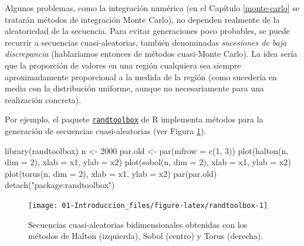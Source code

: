 \documentclass[
  10pt,
]{book}
\newenvironment{Shaded}{\begin{snugshade}}{\end{snugshade}}
\newcommand{\AttributeTok}[1]{\textcolor[rgb]{0.77,0.63,0.00}{#1}}
\newcommand{\DecValTok}[1]{\textcolor[rgb]{0.00,0.00,0.81}{#1}}
\newcommand{\FunctionTok}[1]{\textcolor[rgb]{0.00,0.00,0.00}{#1}}
\newcommand{\NormalTok}[1]{#1}
\newcommand{\OtherTok}[1]{\textcolor[rgb]{0.56,0.35,0.01}{#1}}
\newcommand{\StringTok}[1]{\textcolor[rgb]{0.31,0.60,0.02}{#1}}
\theoremstyle{break}
\theoremstyle{nonumberplain}
\begin{document}
Algunos problemas, como la integración numérica (en el Capítulo \ref{monte-carlo} se tratarán métodos de integración Monte Carlo), no dependen realmente de la aleatoriedad de la secuencia. Para evitar generaciones poco probables, se puede recurrir a secuencias cuasi-aleatorias, también denominadas \emph{sucesiones de baja discrepancia} (hablaríamos entonces de métodos cuasi-Monte Carlo). La idea sería que la proporción de valores en una región cualquiera sea siempre aproximadamente proporcional a la medida de la región (como sucedería en media con la distribución uniforme, aunque no necesariamente para una realización concreta).

Por ejemplo, el paquete \href{https://CRAN.R-project.org/package=randtoolbox}{\texttt{randtoolbox}} de R implementa métodos para la generación de secuencias cuasi-aleatorias (ver Figura \ref{fig:randtoolbox}).

\begin{Shaded}
\begin{Highlighting}[]
\FunctionTok{library}\NormalTok{(randtoolbox)}
\NormalTok{n }\OtherTok{\textless{}{-}} \DecValTok{2000}
\NormalTok{par.old }\OtherTok{\textless{}{-}} \FunctionTok{par}\NormalTok{(}\AttributeTok{mfrow =} \FunctionTok{c}\NormalTok{(}\DecValTok{1}\NormalTok{, }\DecValTok{3}\NormalTok{))}
\FunctionTok{plot}\NormalTok{(}\FunctionTok{halton}\NormalTok{(n, }\AttributeTok{dim =} \DecValTok{2}\NormalTok{), }\AttributeTok{xlab =} \StringTok{\textquotesingle{}x1\textquotesingle{}}\NormalTok{, }\AttributeTok{ylab =} \StringTok{\textquotesingle{}x2\textquotesingle{}}\NormalTok{)}
\FunctionTok{plot}\NormalTok{(}\FunctionTok{sobol}\NormalTok{(n, }\AttributeTok{dim =} \DecValTok{2}\NormalTok{), }\AttributeTok{xlab =} \StringTok{\textquotesingle{}x1\textquotesingle{}}\NormalTok{, }\AttributeTok{ylab =} \StringTok{\textquotesingle{}x2\textquotesingle{}}\NormalTok{)}
\FunctionTok{plot}\NormalTok{(}\FunctionTok{torus}\NormalTok{(n, }\AttributeTok{dim =} \DecValTok{2}\NormalTok{), }\AttributeTok{xlab =} \StringTok{\textquotesingle{}x1\textquotesingle{}}\NormalTok{, }\AttributeTok{ylab =} \StringTok{\textquotesingle{}x2\textquotesingle{}}\NormalTok{)}
\FunctionTok{par}\NormalTok{(par.old)}
\FunctionTok{detach}\NormalTok{(}\StringTok{"package:randtoolbox"}\NormalTok{)}
\end{Highlighting}
\end{Shaded}

\begin{figure}[!htbp]

{\centering \texttt{[image: 01-Introduccion\_files/figure-latex/randtoolbox-1]} 

}

\caption{Secuencias cuasi-aleatorias bidimensionales obtenidas con los métodos de Halton (izquierda), Sobol (centro) y Torus (derecha).}\label{fig:randtoolbox}
\end{figure}
\end{document}
